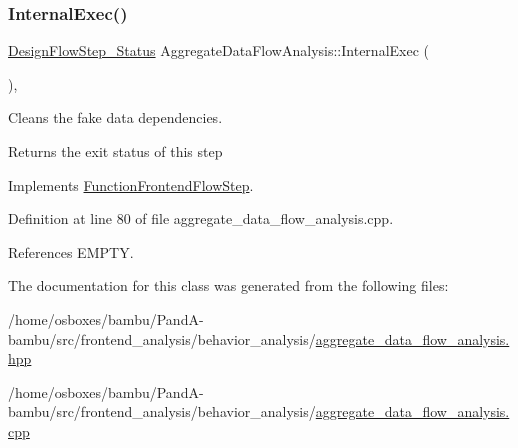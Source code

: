 \subsubsection{\texorpdfstring{Internal\+Exec()}{InternalExec()}}
{\footnotesize\ttfamily \hyperlink{design__flow__step_8hpp_afb1f0d73069c26076b8d31dbc8ebecdf}{Design\+Flow\+Step\+\_\+\+Status} Aggregate\+Data\+Flow\+Analysis\+::\+Internal\+Exec (\begin{DoxyParamCaption}{ }\end{DoxyParamCaption})\hspace{0.3cm}{\ttfamily [override]}, {\ttfamily [virtual]}}



Cleans the fake data dependencies. 

\begin{DoxyReturn}{Returns}
the exit status of this step 
\end{DoxyReturn}


Implements \hyperlink{classFunctionFrontendFlowStep_a00612f7fb9eabbbc8ee7e39d34e5ac68}{Function\+Frontend\+Flow\+Step}.



Definition at line 80 of file aggregate\+\_\+data\+\_\+flow\+\_\+analysis.\+cpp.



References E\+M\+P\+TY.



The documentation for this class was generated from the following files\+:\begin{DoxyCompactItemize}
\item 
/home/osboxes/bambu/\+Pand\+A-\/bambu/src/frontend\+\_\+analysis/behavior\+\_\+analysis/\hyperlink{aggregate__data__flow__analysis_8hpp}{aggregate\+\_\+data\+\_\+flow\+\_\+analysis.\+hpp}\item 
/home/osboxes/bambu/\+Pand\+A-\/bambu/src/frontend\+\_\+analysis/behavior\+\_\+analysis/\hyperlink{aggregate__data__flow__analysis_8cpp}{aggregate\+\_\+data\+\_\+flow\+\_\+analysis.\+cpp}\end{DoxyCompactItemize}

